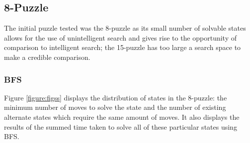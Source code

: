 \documentclass[final]{cmpreport}
\begin{document}
\subsection{8-Puzzle}
The initial puzzle tested was the 8-puzzle as its small number of solvable states allows for the use of unintelligent search and gives rise to the opportunity of comparison to intelligent search; the 15-puzzle has too large a search space to make a credible comparison. 






\subsubsection{BFS}

Figure \ref{figure:figss} displays the distribution of states in the 8-puzzle: the minimum number of moves to solve the state and the number of existing alternate states which require the same amount of moves. It also displays the results of the summed time taken to solve all of these particular states using BFS.  
\end{document}
